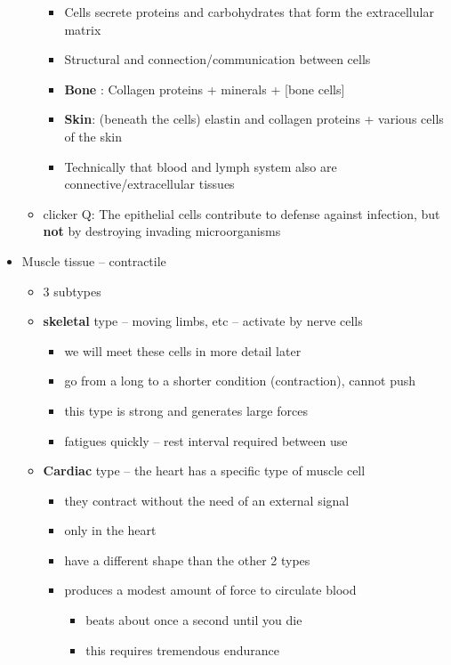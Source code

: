 \documentclass{article}
\theoremstyle{definition}
\begin{document}
\begin{itemize}
\begin{itemize}
				\begin{itemize}
					\item Cells secrete proteins and carbohydrates that form the extracellular matrix
					\item Structural and connection/communication between cells
					\item \textbf{Bone} : Collagen proteins + minerals + [bone cells]
					\item \textbf{Skin}: (beneath the cells) elastin and collagen proteins + various cells of the skin
					\item Technically that blood and lymph system also are connective/extracellular tissues
				\end{itemize}
			\item clicker Q: The epithelial cells contribute to defense against infection, but \textbf{not} by destroying invading microorganisms
		\end{itemize}
	\item Muscle tissue -- contractile
		\begin{itemize}
			\item 3 subtypes
			\item \textbf{skeletal} type -- moving limbs, etc -- activate by nerve cells
				\begin{itemize}
					\item we will meet these cells in more detail later
					\item go from a long to a shorter condition (contraction), cannot push
					\item this type is strong and generates large forces
					\item fatigues quickly -- rest interval required between use
				\end{itemize}
			\item \textbf{Cardiac} type -- the heart has a specific type of muscle cell 
				\begin{itemize}
					\item they contract without the need of an external signal
					\item only in the heart
					\item have a different shape than the other 2 types
					\item produces a modest amount of force to circulate blood
						\begin{itemize}
							\item beats about once a second until you die
							\item this requires tremendous endurance

\end{itemize}
\end{itemize}
\end{itemize}
\end{itemize}
\end{document}
